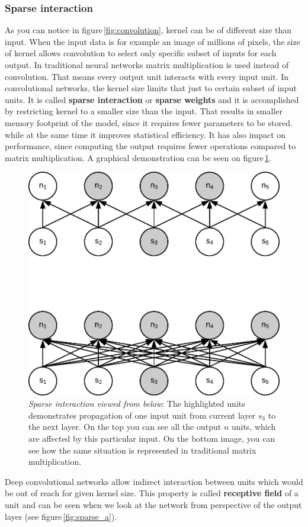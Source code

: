 \subsubsection{Sparse interaction}

As you can notice in figure\,\ref{fig:convolution}, kernel can be of different size than input. When the input data is for example an image of millions of pixels, the size of kernel allows convolution to select only specific subset of inputs for each output. In traditional neural networks matrix multiplication is used instead of convolution. That means every output unit interacts with every input unit. In convolutional networks, the kernel size limits that just to certain subset of input units. It is called \textbf{sparse interaction} or \textbf{sparse weights} and it is accomplished by restricting kernel to a smaller size than the input. That results in smaller memory footprint of the model, since it requires fewer parameters to be stored. while at the same time it improves statistical efficiency. It has also impact on performance, since computing the output requires fewer operations compared to matrix multiplication. A graphical demonstration can be seen on figure\,\ref{fig:sparse_b}.

\begin{figure}[ht]
    \centering
    \includegraphics[width=.6\textwidth]{obrazky-figures/sparse_b.pdf}
    \caption{\textit{Sparse interaction viewed from below}: The highlighted units demonstrates propagation of one input unit from current layer $s_3$ to the next layer. On the top you can see all the output $n$ units, which are affected by this particular input. On the bottom image, you can see how the same situation is represented in traditional matrix multiplication.}\label{fig:sparse_b}
\end{figure}

Deep convolutional networks allow indirect interaction between units which would be out of reach for given kernel size. This property is called \textbf{receptive field} of a unit and can be seen when we look at the network from perspective of the output layer (see figure\,\ref{fig:sparse_a}).

